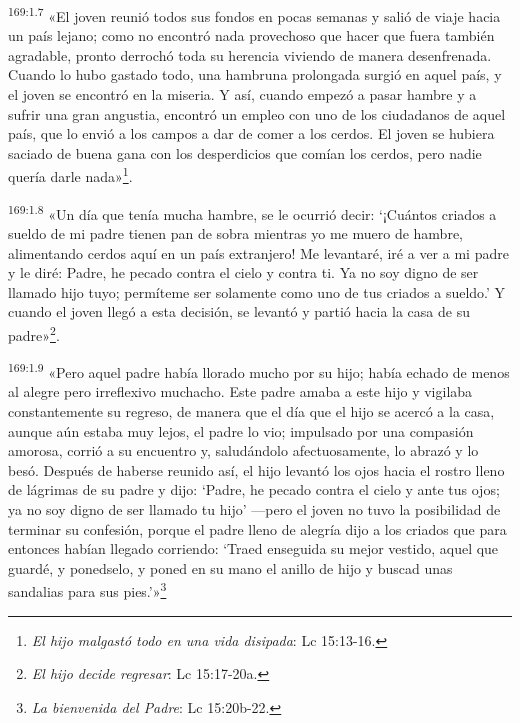 \par 
\textsuperscript{169:1.7} «El joven reunió todos sus fondos en pocas semanas y salió de viaje hacia un país lejano; como no encontró nada provechoso que hacer que fuera también agradable, pronto derrochó toda su herencia viviendo de manera desenfrenada. Cuando lo hubo gastado todo, una hambruna prolongada surgió en aquel país, y el joven se encontró en la miseria. Y así, cuando empezó a pasar hambre y a sufrir una gran angustia, encontró un empleo con uno de los ciudadanos de aquel país, que lo envió a los campos a dar de comer a los cerdos. El joven se hubiera saciado de buena gana con los desperdicios que comían los cerdos, pero nadie quería darle nada»\footnote{\textit{El hijo malgastó todo en una vida disipada}: Lc 15:13-16.}.

\par 
\textsuperscript{169:1.8} «Un día que tenía mucha hambre, se le ocurrió decir: `¡Cuántos criados a sueldo de mi padre tienen pan de sobra mientras yo me muero de hambre, alimentando cerdos aquí en un país extranjero! Me levantaré, iré a ver a mi padre y le diré: Padre, he pecado contra el cielo y contra ti. Ya no soy digno de ser llamado hijo tuyo; permíteme ser solamente como uno de tus criados a sueldo.' Y cuando el joven llegó a esta decisión, se levantó y partió hacia la casa de su padre»\footnote{\textit{El hijo decide regresar}: Lc 15:17-20a.}.

\par 
\textsuperscript{169:1.9} «Pero aquel padre había llorado mucho por su hijo; había echado de menos al alegre pero irreflexivo muchacho. Este padre amaba a este hijo y vigilaba constantemente su regreso, de manera que el día que el hijo se acercó a la casa, aunque aún estaba muy lejos, el padre lo vio; impulsado por una compasión amorosa, corrió a su encuentro y, saludándolo afectuosamente, lo abrazó y lo besó. Después de haberse reunido así, el hijo levantó los ojos hacia el rostro lleno de lágrimas de su padre y dijo: `Padre, he pecado contra el cielo y ante tus ojos; ya no soy digno de ser llamado tu hijo' ---pero el joven no tuvo la posibilidad de terminar su confesión, porque el padre lleno de alegría dijo a los criados que para entonces habían llegado corriendo: `Traed enseguida su mejor vestido, aquel que guardé, y ponedselo, y poned en su mano el anillo de hijo y buscad unas sandalias para sus pies.'»\footnote{\textit{La bienvenida del Padre}: Lc 15:20b-22.}

